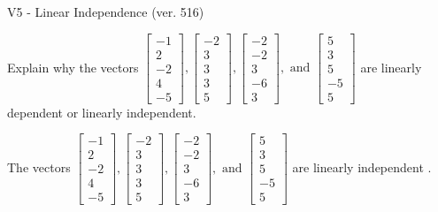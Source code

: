 \begin{exercise}
  \begin{exerciseTitle}V5 - Linear Independence (ver. 516)\end{exerciseTitle}
  \begin{exerciseStatement}
    Explain why the vectors \(\left[\begin{array}{r}
-1 \\
2 \\
-2 \\
4 \\
-5
\end{array}\right] , \left[\begin{array}{r}
-2 \\
3 \\
3 \\
3 \\
5
\end{array}\right] , \left[\begin{array}{r}
-2 \\
-2 \\
3 \\
-6 \\
3
\end{array}\right] , \text{ and } \left[\begin{array}{r}
5 \\
3 \\
5 \\
-5 \\
5
\end{array}\right]\) are linearly dependent or linearly independent.	


  \end{exerciseStatement}
  \begin{exerciseAnswer}
   The vectors \(\left[\begin{array}{r}
-1 \\
2 \\
-2 \\
4 \\
-5
\end{array}\right] , \left[\begin{array}{r}
-2 \\
3 \\
3 \\
3 \\
5
\end{array}\right] , \left[\begin{array}{r}
-2 \\
-2 \\
3 \\
-6 \\
3
\end{array}\right] , \text{ and } \left[\begin{array}{r}
5 \\
3 \\
5 \\
-5 \\
5
\end{array}\right]\) are 
  	 linearly independent  .
  


  \end{exerciseAnswer}
\end{exercise}
